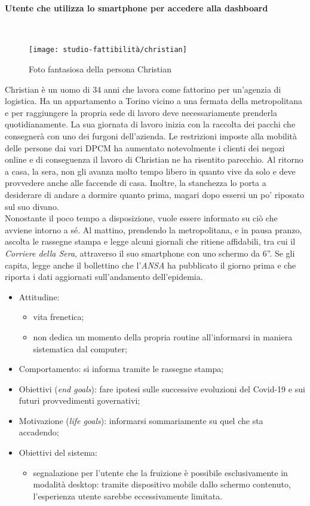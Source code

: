 \paragraph{Utente che utilizza lo smartphone per accedere alla dashboard}\mbox{}\\
\begin{wrapfigure}{l}{7cm}
    \texttt{[image: studio-fattibilità/christian]}
    \caption{Foto fantasiosa della persona Christian}
\end{wrapfigure}
Christian è un uomo di 34 anni che lavora come fattorino per un'agenzia di logistica. Ha un appartamento a Torino vicino a una fermata della metropolitana e per raggiungere la propria sede di lavoro deve necessariamente prenderla quotidianamente. La sua giornata di lavoro inizia con la raccolta dei pacchi che consegnerà con uno dei furgoni dell'azienda. Le restrizioni imposte alla mobilità delle persone dai vari DPCM ha aumentato notevolmente i clienti dei negozi online e di conseguenza il lavoro di Christian ne ha risentito parecchio. Al ritorno a casa, la sera, non gli avanza molto tempo libero in quanto vive da solo e deve provvedere anche alle faccende di casa. Inoltre, la stanchezza lo porta a desiderare di andare a dormire quanto prima, magari dopo essersi un po' riposato sul suo divano.\\
Nonostante il poco tempo a disposizione, vuole essere informato su ciò che avviene intorno a sé. Al mattino, prendendo la metropolitana, e in pausa pranzo, ascolta le rassegne stampa e legge alcuni giornali che ritiene affidabili, tra cui il \textit{Corriere della Sera}, attraverso il suo smartphone con uno schermo da 6''. Se gli capita, legge anche il bollettino che l'\textit{ANSA} ha pubblicato il giorno prima e che riporta i dati aggiornati sull'andamento dell'epidemia.
\begin{itemize}
	\item Attitudine:
    \begin{itemize}
        \item vita frenetica;
        \item non dedica un momento della propria routine all'informarsi in maniera sistematica dal computer;
    \end{itemize}
    \item Comportamento: si informa tramite le rassegne stampa;
    \item Obiettivi (\textit{end goals}): fare ipotesi sulle successive evoluzioni del Covid-19 e sui futuri provvedimenti governativi;
    \item Motivazione (\textit{life goals}): informarsi sommariamente su quel che sta accadendo;
    \item Obiettivi del sistema:
    \begin{itemize}
        \item segnalazione per l'utente che la fruizione è possibile esclusivamente in modalità desktop: tramite dispositivo mobile dallo schermo contenuto, l'esperienza utente sarebbe eccessivamente limitata. 
    \end{itemize}
\end{itemize}